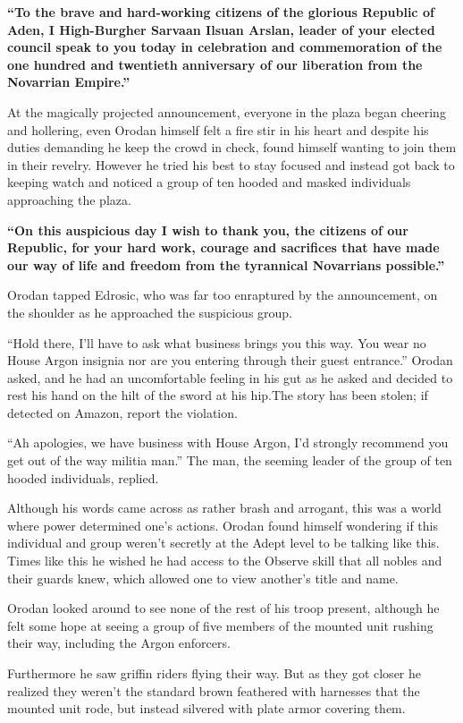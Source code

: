 \documentclass[a4paper,10pt]{book}
\begin{document}
\textbf{“To the brave and hard-working citizens of the glorious Republic of Aden, I High-Burgher Sarvaan Ilsuan Arslan, leader of your elected council speak to you today in celebration and commemoration of the one hundred and twentieth anniversary of our liberation from the Novarrian Empire.”}\par
At the magically projected announcement, everyone in the plaza began cheering and hollering, even Orodan himself felt a fire stir in his heart and despite his duties demanding he keep the crowd in check, found himself wanting to join them in their revelry. However he tried his best to stay focused and instead got back to keeping watch and noticed a group of ten hooded and masked individuals approaching the plaza.\par
\textbf{“On this auspicious day I wish to thank you, the citizens of our Republic, for your hard work, courage and sacrifices that have made our way of life and freedom from the tyrannical Novarrians possible.”}\par
Orodan tapped Edrosic, who was far too enraptured by the announcement, on the shoulder as he approached the suspicious group.\par
“Hold there, I’ll have to ask what business brings you this way. You wear no House Argon insignia nor are you entering through their guest entrance.” Orodan asked, and he had an uncomfortable feeling in his gut as he asked and decided to rest his hand on the hilt of the sword at his hip.The story has been stolen; if detected on Amazon, report the violation.\par
“Ah apologies, we have business with House Argon, I’d strongly recommend you get out of the way militia man.” The man, the seeming leader of the group of ten hooded individuals, replied.\par
Although his words came across as rather brash and arrogant, this was a world where power determined one’s actions. Orodan found himself wondering if this individual and group weren’t secretly at the Adept level to be talking like this. Times like this he wished he had access to the Observe skill that all nobles and their guards knew, which allowed one to view another's title and name.\par
Orodan looked around to see none of the rest of his troop present, although he felt some hope at seeing a group of five members of the mounted unit rushing their way, including the Argon enforcers.\par
Furthermore he saw griffin riders flying their way. But as they got closer he realized they weren’t the standard brown feathered with harnesses that the mounted unit rode, but instead silvered with plate armor covering them.\par
\end{document}
